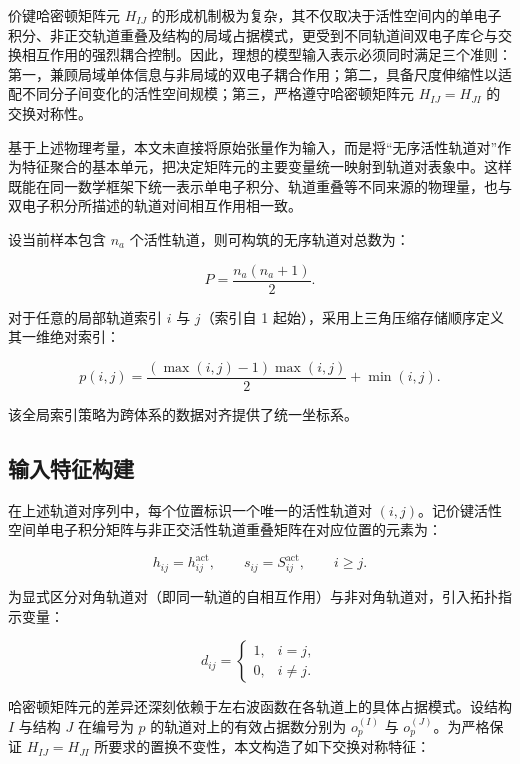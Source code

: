 价键哈密顿矩阵元 $H_{IJ}$ 的形成机制极为复杂，其不仅取决于活性空间内的单电子积分、非正交轨道重叠及结构的局域占据模式，更受到不同轨道间双电子库仑与交换相互作用的强烈耦合控制。因此，理想的模型输入表示必须同时满足三个准则：第一，兼顾局域单体信息与非局域的双电子耦合作用；第二，具备尺度伸缩性以适配不同分子间变化的活性空间规模；第三，严格遵守哈密顿矩阵元 $H_{IJ}=H_{JI}$ 的交换对称性。

基于上述物理考量，本文未直接将原始张量作为输入，而是将“无序活性轨道对”作为特征聚合的基本单元，把决定矩阵元的主要变量统一映射到轨道对表象中。这样既能在同一数学框架下统一表示单电子积分、轨道重叠等不同来源的物理量，也与双电子积分所描述的轨道对间相互作用相一致。

设当前样本包含 $n_a$ 个活性轨道，则可构筑的无序轨道对总数为：

\begin{equation}
P = \frac{n_a(n_a + 1)}{2}.
\end{equation}

对于任意的局部轨道索引 $i$ 与 $j$（索引自 1 起始），采用上三角压缩存储顺序定义其一维绝对索引：

\begin{equation}
p(i, j) = \frac{\left(\max(i, j) - 1\right)\max(i, j)}{2} + \min(i, j).
\end{equation}

该全局索引策略为跨体系的数据对齐提供了统一坐标系。

\subsection{输入特征构建}

在上述轨道对序列中，每个位置标识一个唯一的活性轨道对 $(i,j)$。记价键活性空间单电子积分矩阵与非正交活性轨道重叠矩阵在对应位置的元素为：

\begin{equation}
h_{ij} = h_{ij}^{\mathrm{act}},\qquad s_{ij} = S_{ij}^{\mathrm{act}},\qquad i \ge j.
\end{equation}

为显式区分对角轨道对（即同一轨道的自相互作用）与非对角轨道对，引入拓扑指示变量：

\begin{equation}
d_{ij} =
\begin{cases}
1, & i = j, \\
0, & i \ne j.
\end{cases}
\end{equation}

哈密顿矩阵元的差异还深刻依赖于左右波函数在各轨道上的具体占据模式。设结构 $I$ 与结构 $J$ 在编号为 $p$ 的轨道对上的有效占据数分别为 $o_p^{(I)}$ 与 $o_p^{(J)}$。为严格保证 $H_{IJ} = H_{JI}$ 所要求的置换不变性，本文构造了如下交换对称特征：

